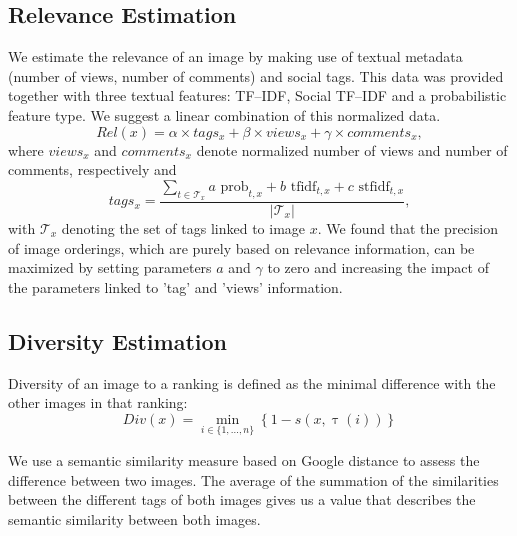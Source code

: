 \documentclass{acm_proc_article-me11_tweaked}
\begin{document}
\subsection{Relevance Estimation}
\label{text-relevance}
We estimate the relevance of an image by making use of textual metadata (number of views, number of comments) and social tags.
This data was provided together with three textual features: TF--IDF, Social TF--IDF and a probabilistic feature type.
We suggest a linear combination of this normalized data.
\begin{equation}
Rel(x) = \alpha \times tags_x + \beta \times views_x + \gamma \times comments_x,
\end{equation}
where $views_x$ and $comments_x$ denote normalized number of views and number of comments, respectively and
\begin{equation}
tags_x = \frac{ \sum_{t \in \mathscr{T}_x} a\text{ prob}_{t,x} + b\text{ tfidf}_{t,x} + c\text{ stfidf}_{t,x}}{|\mathscr{T}_x|} , 
\end{equation}
with $\mathscr{T}_x$ denoting the set of tags linked to image $x$.
We found that the precision of image orderings, which are purely based on relevance information, can be maximized by setting parameters $a$ and $\gamma$ to zero and increasing the impact of the parameters linked to 'tag' and 'views' information.




\subsection{Diversity Estimation}
Diversity of an image to a ranking is defined as the minimal difference with the other images in that ranking:
\begin{equation}
 Div(x) = \min_{i \in \{1,\ldots,n\}} \left\{  1 - s(x, \uptau(i))\right\}
\end{equation}

We use a semantic similarity measure based on Google distance to assess the difference between two images.
The average of the summation of the similarities between the different tags of both images gives us a value that describes the semantic similarity between both images.
\end{document}
